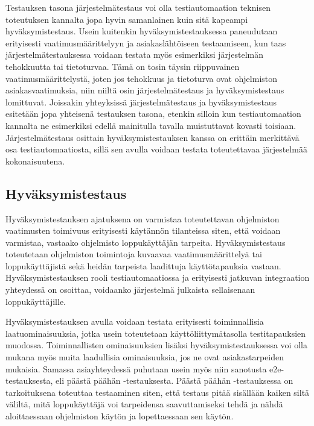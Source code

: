     Testauksen tasona järjestelmätestaus voi olla testiautomaation teknisen toteutuksen kannalta jopa hyvin samanlainen kuin sitä kapeampi hyväksymistestaus.
    Usein kuitenkin hyväksymistestauksessa paneudutaan erityisesti vaatimusmäärittelyyn ja asiakaslähtöiseen testaamiseen, kun taas järjestelmätestauksessa voidaan testata myös esimerkiksi järjestelmän tehokkuutta tai tietoturvaa.
    Tämä on tosin täysin riippuvainen vaatimusmäärittelystä, joten jos tehokkuus ja tietoturva ovat ohjelmiston asiakasvaatimuksia, niin niiltä osin järjestelmätestaus ja hyväksymistestaus lomittuvat.
    Joissakin yhteyksissä järjestelmätestaus ja hyväksymistestaus esitetään jopa yhteisenä testauksen tasona, etenkin silloin kun testiautomaation kannalta ne esimerkiksi edellä mainitulla tavalla muistuttavat kovasti toisiaan.
    Järjestelmätestaus osittain hyväksymistestauksen kanssa on erittäin merkittävä osa testiautomaatiosta, sillä sen avulla voidaan testata toteutettavaa järjestelmää kokonaisuutena.

  \subsection{Hyväksymistestaus} \label{ch:07_hyvaksymistestaus}

    Hyväksymistestauksen ajatuksena on varmistaa toteutettavan ohjelmiston vaatimusten toimivuus erityisesti käytännön tilanteissa siten, että voidaan varmistaa, vastaako ohjelmisto loppukäyttäjän tarpeita.
    Hyväksymistestaus toteutetaan ohjelmiston toimintoja kuvaavaa vaatimusmäärittelyä tai loppukäyttäjistä sekä heidän tarpeista laadittuja käyttötapauksia vastaan.
    Hyväksymistestauksen rooli testiautomaatiossa ja erityisesti jatkuvan integraation yhteydessä on osoittaa, voidaanko järjestelmä julkaista sellaisenaan loppukäyttäjille.

    Hyväksymistestauksen avulla voidaan testata erityisesti toiminnallisia laatuominaisuuksia, jotka usein toteutetaan käyttöliittymätasolla testitapauksien muodossa.
    Toiminnallisten ominaisuuksien lisäksi hyväksymistestauksessa voi olla mukana myös muita laadullisia ominaisuuksia, jos ne ovat asiakastarpeiden mukaisia.
    Samassa asiayhteydessä puhutaan usein myös niin sanotusta e2e-testauksesta, eli päästä päähän -testauksesta.
    Päästä päähän -testauksessa on tarkoituksena toteuttaa testaaminen siten, että testaus pitää sisällään kaiken siltä väliltä, mitä loppukäyttäjä voi tarpeidensa saavuttamiseksi tehdä ja nähdä aloittaessaan ohjelmiston käytön ja lopettaessaan sen käytön.

